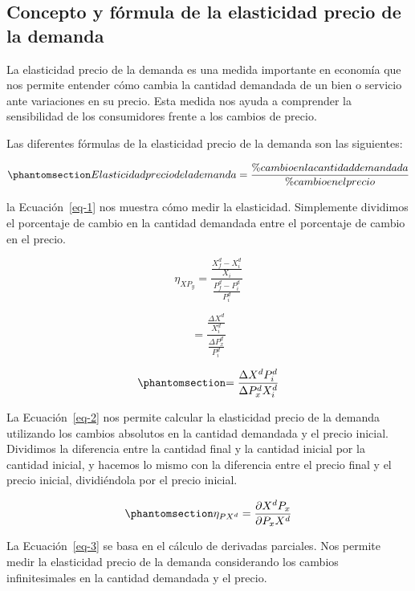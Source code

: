 \documentclass[
  jou,
  floatsintext,
  longtable,
  a4paper,
  nolmodern,
  notxfonts,
  notimes,
  12pt,
  colorlinks=true,linkcolor=blue,citecolor=blue,urlcolor=blue]{apa7}
\begin{document}
\subsection{Concepto y fórmula de la elasticidad precio de la
demanda}\label{concepto-y-fuxf3rmula-de-la-elasticidad-precio-de-la-demanda}

La elasticidad precio de la demanda es una medida importante en economía
que nos permite entender cómo cambia la cantidad demandada de un bien o
servicio ante variaciones en su precio. Esta medida nos ayuda a
comprender la sensibilidad de los consumidores frente a los cambios de
precio.

Las diferentes fórmulas de la elasticidad precio de la demanda son las
siguientes:

\begin{equation}\protect\phantomsection\label{eq-1}{
Elasticidad precio de la demanda =\frac{\% cambio en la cantidad demandada}{\% cambio en el precio}
}\end{equation}

la Ecuación~\ref{eq-1} nos muestra cómo medir la elasticidad.
Simplemente dividimos el porcentaje de cambio en la cantidad demandada
entre el porcentaje de cambio en el precio.

\[
\eta _{XP_y} = \frac{\frac {X_f^d - X_i^d}{X_i}}{\frac {P_f^d - P_i^d}{P_i^d}}
\]

\[
= \frac{\frac{\Delta X^d}{X_i^d}}{\frac{\Delta P_x^d}{P_i^d}}
\]

\begin{equation}\protect\phantomsection\label{eq-2}{
= \frac{\Delta X^d P_i^d}{\Delta P_x^d X_i^d}
}\end{equation}

La Ecuación~\ref{eq-2} nos permite calcular la elasticidad precio de la
demanda utilizando los cambios absolutos en la cantidad demandada y el
precio inicial. Dividimos la diferencia entre la cantidad final y la
cantidad inicial por la cantidad inicial, y hacemos lo mismo con la
diferencia entre el precio final y el precio inicial, dividiéndola por
el precio inicial.

\begin{equation}\protect\phantomsection\label{eq-3}{
\eta _{PX^d} = \frac{\partial X^d P_x}{\partial P_x X^d}
}\end{equation}

La Ecuación~\ref{eq-3} se basa en el cálculo de derivadas parciales. Nos
permite medir la elasticidad precio de la demanda considerando los
cambios infinitesimales en la cantidad demandada y el precio.
\end{document}
